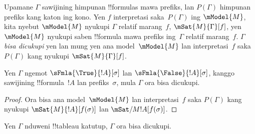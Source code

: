 \documentclass[../../../include/open-logic-section]{subfiles}
\begin{document}
\begin{defn}
  Upamane $\Gamma$ sawijining himpunan !!{formula}s mawa prefiks, lan
  $P(\Gamma)$ himpunan prefiks kang katon ing kono. Yen $f$
  interpretasi saka~$P(\Gamma)$ ing $\mModel{M}$, kita nyebut
  $\mModel{M}$ nyukupi $\Gamma$ relatif marang~$f$,
  $\mSat{M}{\Gamma}[f]$, yen $\mModel{M}$ nyukupi saben !!{formula}
  mawa prefiks ing~$\Gamma$ relatif marang~$f$. $\Gamma$
  \emph{bisa dicukupi} yen lan mung yen ana model~$\mModel{M}$ lan
  interpretasi~$f$ saka $P(\Gamma)$ kang nyukupi
  $\mSat{M}{\Gamma}[f]$.
\end{defn}

\begin{prop}
  Yen $\Gamma$ ngemot $\sFmla{\True}{!A}[\sigma]$ lan
  $\sFmla{\False}{!A}[\sigma]$, kanggo sawijining !!{formula}~$!A$
  lan prefiks~$\sigma$, mula $\Gamma$ ora bisa dicukupi.
\end{prop}

\begin{proof}
  Ora bisa ana model~$\mModel{M}$ lan interpretasi~$f$ saka
  $P(\Gamma)$ kang nyukupi $\mSat{M}{!A}[f(\sigma)]$ lan
  $\mSat/{M}{!A}[f(\sigma)]$.
\end{proof}

\begin{thm}[Kesahihan]
  Yen $\Gamma$ nduweni !!{tableau} katutup, $\Gamma$ ora bisa dicukupi.
\end{thm}
\end{document}
